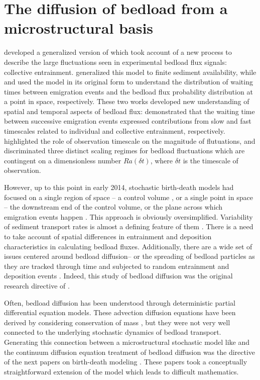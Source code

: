 \section{The diffusion of bedload from a microstructural basis}


\citet{Ancey2008} developed a generalized version of \citet{Einstein1950} which took account of a new process to describe the large fluctuations seen in experimental bedload flux signals: collective entrainment. 
\citet{Turowski2009} generalized this model to finite sediment availability, while \citet{Heyman2013} and \citet{Ma2014} used the \citet{Ancey2008} model in its original form to understand the distribution of waiting times between emigration events and the bedload flux probability distribution at a point in space, respectively. 
These two works developed new understanding of spatial and temporal aspects of bedload flux: \citet{Heyman2013} demonstrated that the waiting time between successive emigration events expressed contributions from slow and fast timescales related to individual and collective entrainment, respectively. 
\citet{Ma2014} highlighted the role of observation timescale on the magnitude of flutuations, and discriminated three distinct scaling regimes for bedload fluctuations which are contingent on a dimensionless number $Ra(\delta t)$, where $\delta t$ is the timescale of observation. 

However, up to this point in early 2014, stochastic birth-death models had focused on a single region of space -- a control volume \citep{Einstein1950, Ancey2006, Ancey2008}, or a single point in space -- the downstream end of the control volume, or the plane across which emigration events happen \citep{Heyman2013, Ma2014b}.
This approach is obviously oversimplified. Variability of sediment transport rates is almost a defining feature of them \citep{Hassan2008, Venditti2016, Nelson2014}. 
There is a need to take account of spatial differences in entrainment and deposition characteristics in calculating bedload fluxes. 
Additionally, there are a wide set of issues centered around bedload diffusion-- or the spreading of bedload particles as they are tracked through time and subjected to random entrainment and deposition events \citep{Hassan2016}. Indeed, this study of bedload diffusion was the original research directive of \citet{Einstein1937}. 

Often, bedload diffusion has been understood through deterministic partial differential equation models. These advection diffusion equations have been derived by considering conservation of mass \citep{}, but they were not very well connected to the underlying stochastic dynamics of bedload transport. 
Generating this connection between a microstructural stochastic model like \citet{Ancey2008} and the continuum diffusion equation treatment of bedload diffusion \citep[e.g.][]{Parker2002} was the directive of the next papers on birth-death modeling \citep{Ancey2014,Ancey2015}. 
These papers took a conceptually straightforward extension of the \citet{Ancey2008} model which leads to difficult mathematics. 

